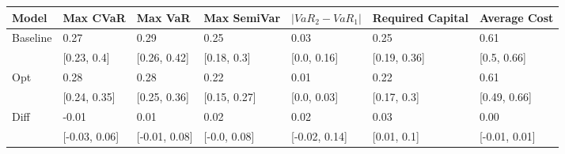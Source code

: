 \begin{tabular}{lllllll}
\toprule
   Model &      Max CVaR &       Max VaR &  Max SemiVar & $|VaR_2 - VaR_1|$ & Required Capital &  Average Cost \\
\midrule
Baseline &          0.27 &          0.29 &         0.25 &              0.03 &             0.25 &          0.61 \\
         &   [0.23, 0.4] &  [0.26, 0.42] &  [0.18, 0.3] &       [0.0, 0.16] &     [0.19, 0.36] &   [0.5, 0.66] \\
     Opt &          0.28 &          0.28 &         0.22 &              0.01 &             0.22 &          0.61 \\
         &  [0.24, 0.35] &  [0.25, 0.36] & [0.15, 0.27] &       [0.0, 0.03] &      [0.17, 0.3] &  [0.49, 0.66] \\
    Diff &         -0.01 &          0.01 &         0.02 &              0.02 &             0.03 &          0.00 \\
         & [-0.03, 0.06] & [-0.01, 0.08] & [-0.0, 0.08] &     [-0.02, 0.14] &      [0.01, 0.1] & [-0.01, 0.01] \\
\bottomrule
\end{tabular}
